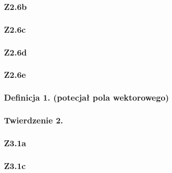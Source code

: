 \documentclass[10pt,a4paper]{article}
\begin{document}
{
    \subsubsection*{Z2.6b}
    \begin{quote}
    \end{quote}

    \subsubsection*{Z2.6c}
    \begin{quote}
    \end{quote}

    \subsubsection*{Z2.6d}
    \begin{quote}
    \end{quote}

    \subsubsection*{Z2.6e}
    \begin{quote}
    \end{quote}

    \begin{tcolorbox}[mybox]
    \subsubsection*{Definicja 1. (potecjał pola wektorowego)}
    \begin{quote}
    \end{quote}

    \subsubsection*{Twierdzenie 2.}
    \begin{quote}
    \end{quote}
    \end{tcolorbox}

    \subsubsection*{Z3.1a}
    \begin{quote}
    \end{quote}
        
    \subsubsection*{Z3.1c}
    \begin{quote}
    \end{quote}

}
\end{document}
